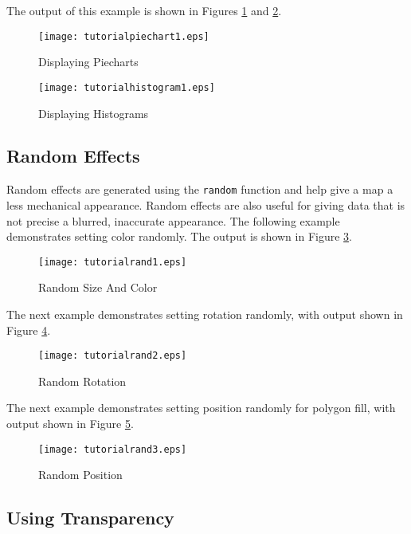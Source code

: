 The output of this example is shown in Figures
\ref{tutorialpiechart1}
and
\ref{tutorialhistogram1}.



\begin{figure}[htb]
\texttt{[image: tutorialpiechart1.eps]}
\caption{Displaying Piecharts}
\label{tutorialpiechart1}
\end{figure}

\begin{figure}[htb]
\texttt{[image: tutorialhistogram1.eps]}
\caption{Displaying Histograms}
\label{tutorialhistogram1}
\end{figure}

\subsection{Random Effects}

Random effects are generated using the \texttt{random}
function and help give a map a less mechanical appearance.
Random effects are also useful for giving data that is not
precise a blurred, inaccurate appearance.
The following example demonstrates setting color randomly.
The output is shown in Figure \ref{tutorialrand1}.



\begin{figure}[htb]
\texttt{[image: tutorialrand1.eps]}
\caption{Random Size And Color}
\label{tutorialrand1}
\end{figure}

The next example demonstrates setting rotation randomly, with output shown in
Figure \ref{tutorialrand2}.



\begin{figure}[htb]
\texttt{[image: tutorialrand2.eps]}
\caption{Random Rotation}
\label{tutorialrand2}
\end{figure}

The next example demonstrates setting position randomly for polygon fill, with
output shown in Figure \ref{tutorialrand3}.



\begin{figure}[htb]
\texttt{[image: tutorialrand3.eps]}
\caption{Random Position}
\label{tutorialrand3}
\end{figure}

\subsection{Using Transparency}


